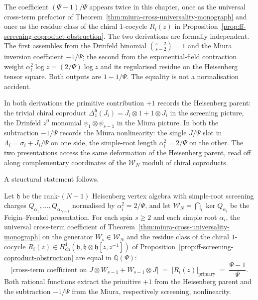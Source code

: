 \begin{remark}
\label{rem:miura-ff-screening-structural-mirror}
The coefficient $(\Psi - 1)/\Psi$ appears twice in this chapter,
once as the universal cross-term prefactor of
Theorem~\ref{thm:miura-cross-universality-monograph} and once as
the residue class of the chiral $1$-cocycle $R_i(z)$ in
Proposition~\ref{prop:ff-screening-coproduct-obstruction}. The
two derivations are formally independent. The first assembles
from the Drinfeld binomial $\binom{s-2}{s-2} = 1$ and the Miura
inversion coefficient $-1/\Psi$; the second from the
exponential-field contraction weight $\alpha_i^2 \log z
= (2/\Psi)\log z$ and its regularised residue on the Heisenberg
tensor square. Both outputs are $1 - 1/\Psi$. The equality is
not a normalisation accident.

In both derivations the primitive contribution $+1$ records the
Heisenberg parent: the trivial chiral coproduct
$\Delta_z^{\mathfrak{h}}(J_i) = J_i \otimes 1 + 1 \otimes J_i$
in the screening picture, the Drinfeld $z^0$ monomial
$\psi_1 \otimes \psi_{s-1}$ in the Miura picture. In both the
subtraction $-1/\Psi$ records the Miura nonlinearity: the single
$J/\Psi$ slot in $\Lambda_i = \sigma_i + J_i/\Psi$ on one side,
the simple-root length $\alpha_i^2 = 2/\Psi$ on the other. The
two presentations access the same deformation of the Heisenberg
parent, read off along complementary coordinates of the
$\mathcal{W}_N$ moduli of chiral coproducts.

A structural statement follows.

\begin{proposition}
\label{prop:miura-ff-screening-identification}
\ClaimStatusConditional
Let $\mathfrak{h}$ be the rank-$(N-1)$ Heisenberg vertex algebra
with simple-root screening charges
$Q_{\alpha_1}, \ldots, Q_{\alpha_{N-1}}$ normalised by
$\alpha_i^2 = 2/\Psi$, and let $\mathcal{W}_N
= \bigcap_i \ker Q_{\alpha_i}$ be the Feigin--Frenkel
presentation. For each spin $s \geq 2$ and each simple root
$\alpha_i$, the universal cross-term coefficient of
Theorem~\textup{\ref{thm:miura-cross-universality-monograph}}
on the generator $W_s \in \mathcal{W}_N$ and the residue class
of the chiral $1$-cocycle $R_i(z) \in H^1_{\mathrm{ch}}(\mathfrak{h},
\mathfrak{h} \otimes \mathfrak{h}[z, z^{-1}])$ of
Proposition~\textup{\ref{prop:ff-screening-coproduct-obstruction}}
are equal in $\mathbb{Q}(\Psi)$:
\begin{equation}\label{eq:miura-ff-identification}
 \bigl[\text{cross-term coefficient on } J \otimes W_{s-1}
 + W_{s-1} \otimes J\bigr]
 \;=\;
 \bigl[R_i(z)\bigr]_{\text{primary}}
 \;=\;
 \frac{\Psi - 1}{\Psi}.
\end{equation}
Both rational functions extract the primitive $+1$ from the
Heisenberg parent and the subtraction $-1/\Psi$ from the Miura,
respectively screening, nonlinearity.
\end{proposition}


\end{remark}

